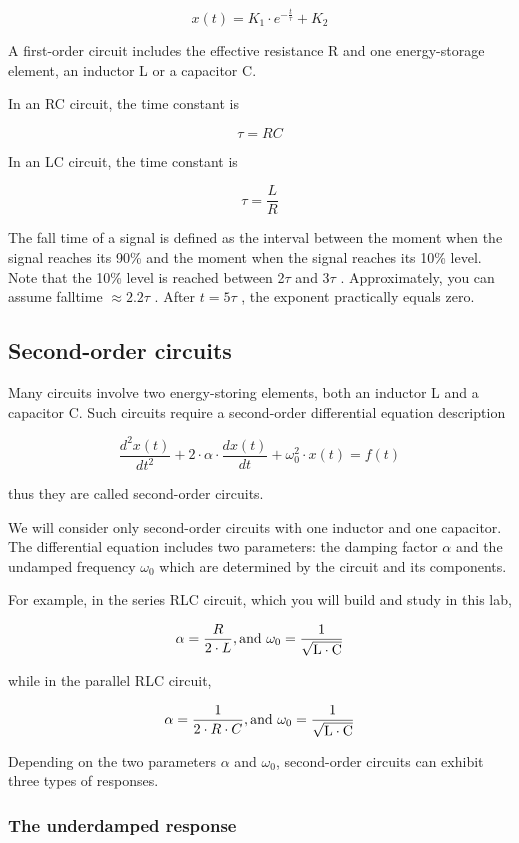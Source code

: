 \documentclass{article}
\begin{document}
$$x(t)=K_1\cdot e^{-\frac{t}{\tau}}+K_2$$

A first-order circuit includes the effective resistance R and one energy-storage
element, an inductor L or a capacitor C.

In an RC circuit, the time constant is

$$\tau=RC$$

In an LC circuit, the time constant is

$$\tau=\frac{L}{R}$$

The fall time of a signal is defined as the interval between the moment when the signal reaches its 90\% and the moment when the signal reaches its 10\% level. Note that the 10\% level is reached between 2$\tau$ and 3$\tau$ . Approximately, you can assume falltime $\approx2.2\tau$ . After $t = 5\tau$ , the exponent practically equals zero.

\subsection{Second-order circuits}


Many circuits involve two energy-storing elements, both an inductor L and a
capacitor C. Such circuits require a second-order differential equation description

$$\frac{d^2x(t)}{dt^2}+2\cdot\alpha\cdot\frac{dx(t)}{dt}+\omega_0^2\cdot x(t)=f(t)$$

thus they are called second-order circuits.

We will consider only second-order circuits with one inductor and one capacitor. The differential equation includes two parameters: the damping factor $\alpha$ and the undamped frequency $\omega_0$ which are determined by the circuit and its components.

For example, in the series RLC circuit, which you will build and study in this lab,

$$\alpha=\frac{R}{2\cdot L},\rm{and}\ \omega_0=\frac{1}{\sqrt{L\cdot C}}$$

while in the parallel RLC circuit,

$$\alpha=\frac{1}{2\cdot R\cdot C},\rm{and}\ \omega_0=\frac{1}{\sqrt{L\cdot C}}$$

Depending on the two parameters $\alpha$ and $\omega_0$, second-order circuits can exhibit three types of responses.

\subsubsection{The underdamped response}
\end{document}

